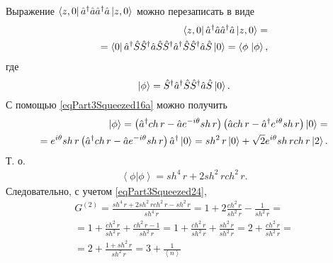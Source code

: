 Выражение
$\bra{z,0}\hat{a}^{\dag}\hat{a}\hat{a}^{\dag}\hat{a}\ket{z,0}$
можно перезаписать в виде
\begin{eqnarray}
  \bra{z,0}\hat{a}^{\dag}\hat{a}\hat{a}^{\dag}\hat{a}\ket{z,0}
  = \nonumber \\
  =
  \bra{0}\hat{a}^{\dag}\hat{S}\hat{S}^{\dag}\hat{a}\hat{S}\hat{S}^{\dag}\hat{a}^{\dag}\hat{S}\hat{S}^{\dag}\hat{a}\hat{S}\ket{0}
  = \left<\phi\right.\left|\phi\right>,
  \nonumber
\end{eqnarray}
где
\[
\left|\phi\right> = \hat{S}^{\dag}\hat{a}^{\dag}\hat{S}\hat{S}^{\dag}\hat{a}\hat{S}\ket{0}.
\]
С помощью \eqref{eqPart3Squeezed16a} можно получить
\begin{eqnarray}
  \left|\phi\right> =  
  \left(\hat{a}^{\dag} ch\,r - \hat{a} e^{-i\theta} sh \, r\right)
  \left(\hat{a} ch\,r - \hat{a}^{\dag} e^{i\theta} sh \, r\right)
  \ket{0} =
  \nonumber \\
  =
   e^{i\theta} sh \, r \left(\hat{a}^{\dag} ch\,r - \hat{a} e^{-i\theta} sh \, r\right)
   \hat{a}^{\dag}\ket{0} =
   sh^2 \, r \ket{0} + \sqrt{2} e^{i\theta}  sh \, r ch \, r\ket{2}.
  \nonumber
\end{eqnarray}
Т. о.
\begin{eqnarray}
  \left<\phi\right.\left|\phi\right> =
  sh^4 \, r + 2 sh^2 \, r ch^2 \, r.
  \nonumber
\end{eqnarray}
Следовательно, с учетом \eqref{eqPart3Squeezed24},
\begin{eqnarray}
G^{(2)} = \frac{sh^4 \, r + 2 sh^2 \, r ch^2 \, r - sh^2 \, r}{sh^4 \,
  r} = 1 + 2 \frac{ch^2 \, r}{sh^2 \, r} - \frac{1}{sh^2 \, r} =
\nonumber \\
=
1 + \frac{ch^2 \, r}{sh^2 \, r} + \frac{ch^2 \, r - 1}{sh^2 \, r} =
1 + \frac{ch^2 \, r}{sh^2 \, r} + \frac{sh^2 \, r }{sh^2 \, r} =
2 + \frac{ch^2 \, r}{sh^2 \, r} =
\nonumber \\
= 2 + \frac{1 + sh^2 \, r}{sh^2 \, r} = 3 + \frac{1}{\left<n\right>}
\nonumber
\end{eqnarray}

